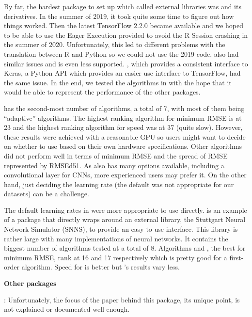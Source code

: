 By far, the hardest package to set up which called external libraries
was  \citep{R-tensorflow} and its derivatives. In
the summer of 2019, it took quite some time to figure out how things
worked. Then the latest TensorFlow 2.2.0 became available and we hoped
to be able to use the Eager Execution provided to avoid the R Session
crashing in the summer of 2020. Unfortunately, this led to different
problems with the translation between R and Python so we could not use
the 2019 code.  \citep{R-tfestimators} also had
similar issues and is even less supported. 
\citep{R-kerasR}, which provides a consistent interface to Keras, a
Python API which provides an easier use interface to TensorFlow, had the
same issue. In the end, we tested the algorithms in 
\citep{R-keras} with the hope that it would be able to represent the
performance of the other packages.

 has the second-most number of algorithms, a total of 7, with
most of them being ``adaptive'' algorithms. The highest ranking
algorithm for minimum RMSE is  at 23 and the highest
ranking algorithm for speed was  at 37 (quite slow).
However, these results were achieved with a reasonable GPU so users
might want to decide on whether to use  based on their own
hardware specifications. Other algorithms did not perform well in terms
of minimum RMSE and the spread of RMSE represented by RMSEd51. As
 also has many options available, including a convolutional
layer for CNNs, more experienced users may prefer it. On the other hand,
just deciding the learning rate (the default was not appropriate for our
datasets) can be a challenge.

The default learning rates in  \citep{R-RSNNS} were more
appropriate to use directly.  is an example of a package that
directly wraps around an external library, the Stuttgart Neural Network
Simulator (SNNS), to provide an easy-to-use interface. This library is
rather large with many implementations of neural networks. It contains
the biggest number of algorithms tested at a total of 8. Algorithms
 and , the best for minimum RMSE, rank at 16 and
17 respectively which is pretty good for a first-order algorithm. Speed
for  is better but 's results vary less.

\textbf{Other packages }

 \citep{R-AMORE}: Unfortunately, the focus of the paper
behind this package, its unique point, is not explained or documented
well enough.

